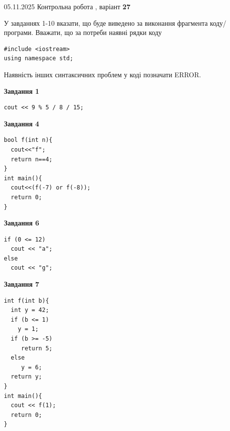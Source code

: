 \documentclass[12pt, ukrainian]{article}
\begin{document}
{\Large{05.11.2025 Контрольна робота , варіант  \No \textbf { 27 }\par}}
{
\begin {large}
У завданнях 1-10 вказати, що буде виведено за виконання фрагмента коду/про\-гра\-ми.
Вважати, що за потреби наявні рядки коду
\begin{verbatim}
#include <iostream>
using namespace std;
\end{verbatim}
Наявність інших синтаксичних проблем у коді позначати ERROR.

\begin{minipage}[t]{7.0cm}

\begin{center}
\textbf{Завдання 1}
\end{center}
\vspace{-8mm}

\begin{verbatim}
cout << 9 % 5 / 8 / 15;
\end{verbatim}



\begin{center}
\textbf{Завдання 4}
\end{center}
\vspace{-8mm}

\begin{verbatim}
bool f(int n){
  cout<<"f";
  return n==4;
}
int main(){
  cout<<(f(-7) or f(-8));
  return 0;
}
\end{verbatim}



\begin{center}
\textbf{Завдання 6}
\end{center}
\vspace{-8mm}

\begin{verbatim}
if (0 <= 12)
  cout << "a";
else
  cout << "g";
\end{verbatim}



\begin{center}
\textbf{Завдання 7}
\end{center}
\vspace{-8mm}

\begin{verbatim}
int f(int b){
  int y = 42;
  if (b <= 1)
    y = 1;
  if (b >= -5)
     return 5;
  else
     y = 6;
  return y;
}
int main(){
  cout << f(1);
  return 0;
}
\end{verbatim}


\end{minipage}
\end{large}}
\end{document}
